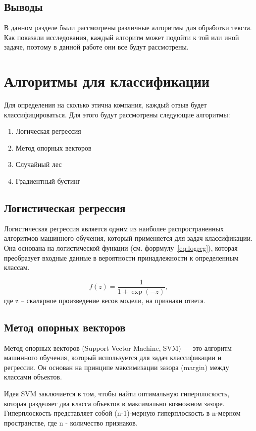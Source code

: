 \documentclass[PI, VKR]{HSEUniversity}
\begin{document}
\subsection{Выводы}
\label{sec:orgb4a5e95}
В данном разделе были рассмотрены различные алгоритмы для обработки текста. Как показали исследования\autocite{gonzalez-carvajal_comparing_}, каждый алгоритм может подойти к той или иной задаче, поэтому в данной работе они все будут рассмотрены.
\section{Алгоритмы для классификации}
\label{sec:org76b5bad}
Для определения на сколько этична компания, каждый отзыв будет классифицироваться. Для этого будут рассмотрены следующие алгоритмы:
\begin{enumerate}
\item Логическая регрессия
\item Метод опорных векторов
\item Случайный лес
\item Градиентный бустинг
\end{enumerate}
\subsection{Логистическая регрессия}
\label{sec:org79c2b0e}
Логистическая регрессия\autocite{fan_liblinear_2008} является одним из наиболее распространенных алгоритмов машинного обучения, который применяется для задач классификации. Она основана на логистической функции (см. форрмулу~\ref{eq:logreg}), которая преобразует входные данные в вероятности принадлежности к определенным классам.

\begin{equation}
\label{eq:logreg}
f(z)=\frac{1}{1+\exp(-z)},
\end{equation}
где z -- скалярное произведение весов модели, на признаки ответа.
\subsection{Метод опорных векторов}
\label{sec:orgee96f60}
Метод опорных векторов\autocite{platt_probabilistic_2000} (Support Vector Machine, SVM) — это алгоритм машинного обучения, который используется для задач классификации и регрессии. Он основан на принципе максимизации зазора (margin) между классами объектов.

Идея SVM заключается в том, чтобы найти оптимальную гиперплоскость, которая разделяет два класса объектов в максимально возможном зазоре. Гиперплоскость представляет собой (n-1)-мерную гиперплоскость в n-мерном пространстве, где n - количество признаков.
\end{document}
